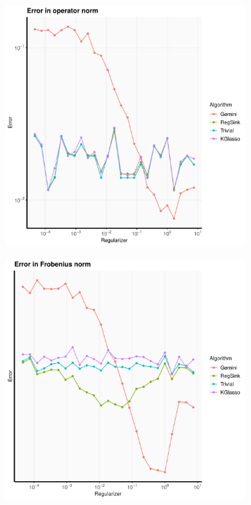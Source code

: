 \documentclass[aos]{imsart}
\theoremstyle{definition}
\numberwithin{equation}{section}
\begin{document}
\begin{figure}
\begin{subfigure}[b]{0.3\textwidth}
         \includegraphics[width=\textwidth]{./code/zhou-comparison/25-50-doubly-sparse-op.pdf}
     \end{subfigure}
     \hfill
     \begin{subfigure}[b]{0.3\textwidth}
         \centering
         \includegraphics[width=\textwidth]{./code/zhou-comparison/25-50-doubly-sparse-frob.pdf}

\end{subfigure}
\end{figure}
\end{document}
